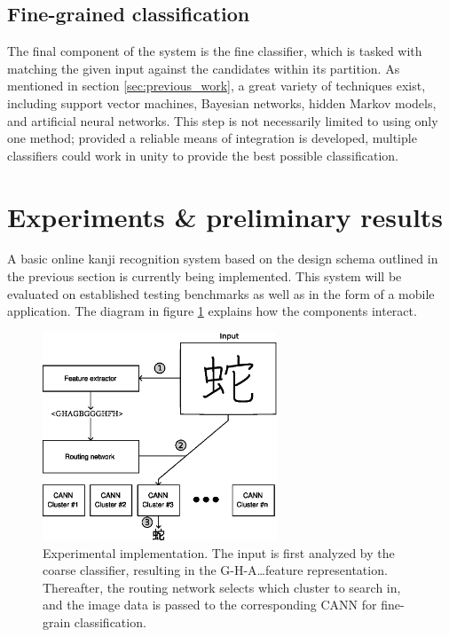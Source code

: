 \documentclass[10pt,conference,a4paper]{IEEEtran}
\begin{document}
	\subsection{Fine-grained classification}

	The final component of the system is the fine classifier, which is tasked with matching the
	given input against the candidates within its partition. As mentioned in section \ref{sec:previous_work}, a great
	variety of techniques exist, including support vector machines, Bayesian networks, hidden Markov models, and artificial neural networks.
	This step is not necessarily limited to using only one method; provided a reliable means of integration is developed,
	multiple classifiers could work in unity to provide the best possible classification.



	\section{Experiments \& preliminary results}
	\label{sec:experiments}

	A basic online kanji recognition system based on the design schema outlined in the previous section is
	currently being implemented. This system will be evaluated on established testing benchmarks
	as well as in the form of a mobile application. The diagram in figure \ref{fig_experimental_implementation} 
	explains how the components interact.

	\begin{figure}
		\centering
		\includegraphics[width=2.75in]{./fig/experimental-implementation.eps}
		\caption{Experimental implementation. The input is first analyzed by the coarse classifier, resulting in the G-H-A\ldots feature representation.
		Thereafter, the routing network selects which cluster to search in, and the image data is passed to the corresponding CANN for fine-grain classification.}
		\label{fig_experimental_implementation}
	\end{figure}
\end{document}
